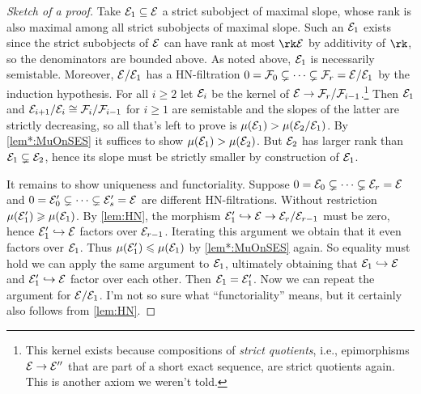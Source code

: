 \documentclass[a4paper, 10pt, oneside, DIV=9, chapterprefix=true, numbers=enddot,bibliography=totoc]{scrbook}
\begin{document}
\begin{proof}[Sketch of a proof]
	Take $\mathcal{E}_1\subseteq \mathcal{E}$ a strict subobject of maximal slope, whose rank is also maximal among all strict subobjects of maximal slope. Such an $\mathcal{E}_1$ exists since the strict subobjects of $\mathcal{E}$ can have rank at most $\rk \Ee$ by additivity of $\rk$, so the denominators are bounded above. As noted above, $\mathcal{E}_1$ is necessarily semistable. Moreover, $\mathcal{E}/\mathcal{E}_1$ has a HN-filtration $0=\mathcal{F}_0\subsetneq \dotsb \subsetneq \mathcal{F}_r=\mathcal{E}/\mathcal{E}_1$ by the induction hypothesis. For all $i\geq 2$ let $\mathcal{E}_i$ be the kernel of $\Ee\morphism \Ff_r/\Ff_{i-1}$.\footnote{This kernel exists because compositions of \emph{strict quotients}, i.e., epimorphisms $\Ee\morphism\Ee''$ that are part of a short exact sequence, are strict quotients again. This is another axiom we weren't told.} Then $\mathcal{E}_1$ and $\mathcal{E}_{i+1}/\mathcal{E}_i\cong \mathcal{F}_i/\mathcal{F}_{i-1}$ for $i\geq 1$ are semistable and the slopes of the latter are strictly decreasing, so all that's left to prove is $\mu(\mathcal{E}_1)>\mu(\mathcal{E}_2/\mathcal{E}_1)$. By \cref{lem*:MuOnSES} it suffices to show $\mu(\mathcal{E}_1)>\mu(\mathcal{E}_2)$. But $\mathcal{E}_2$ has larger rank than $\mathcal{E}_1\subsetneq \mathcal{E}_2$, hence its slope must be strictly smaller by construction of $\mathcal{E}_1$.
	
	It remains to show uniqueness and functoriality. Suppose $0=\mathcal{E}_0\subsetneq \dotsb\subsetneq \mathcal{E}_r=\mathcal{E}$ and $0=\mathcal{E}'_0\subsetneq \dotsb\subsetneq \mathcal{E}'_s=\mathcal{E}$ are different HN-filtrations. Without restriction $\mu(\mathcal{E}_1')\geqslant \mu(\mathcal{E}_1)$. By \cref{lem:HN}, the morphism $\Ee_1'\monomorphism \Ee\morphism \Ee_r/\Ee_{r-1}$ must be zero, hence $\Ee_1'\monomorphism \Ee$ factors over $\mathcal{E}_{r-1}$. Iterating this argument we obtain that it even factors over $\mathcal{E}_1$. Thus $\mu(\mathcal{E}_1')\leqslant \mu(\mathcal{E}_1)$ by \cref{lem*:MuOnSES} again. So equality must hold we can apply the same argument to $\mathcal{E}_1$, ultimately obtaining that $\Ee_1\monomorphism \Ee$ and $\Ee_1'\monomorphism \Ee$ factor over each other. Then $\mathcal{E}_1=\mathcal{E}_1'$. Now we can repeat the argument for $\mathcal{E}/\mathcal{E}_1$. I'm not so sure what \enquote{functoriality} means, but it certainly also follows from \cref{lem:HN}.
\end{proof}
\end{document}
